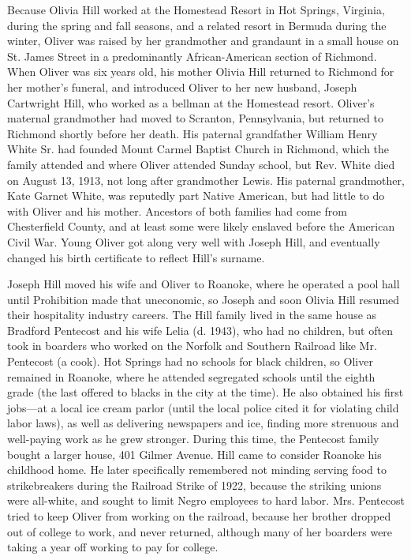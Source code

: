 Because Olivia Hill worked at the Homestead Resort in Hot Springs,
Virginia, during the spring and fall seasons, and a related resort in
Bermuda during the winter, Oliver was raised by her grandmother and
grandaunt in a small house on St. James Street in a predominantly
African-American section of Richmond. When Oliver was six years old, his
mother Olivia Hill returned to Richmond for her mother's funeral, and
introduced Oliver to her new husband, Joseph Cartwright Hill, who worked
as a bellman at the Homestead resort. Oliver's maternal grandmother had
moved to Scranton, Pennsylvania, but returned to Richmond shortly before
her death. His paternal grandfather William Henry White Sr. had founded
Mount Carmel Baptist Church in Richmond, which the family attended and
where Oliver attended Sunday school, but Rev. White died on August 13,
1913, not long after grandmother Lewis. His paternal grandmother, Kate
Garnet White, was reputedly part Native American, but had little to do
with Oliver and his mother. Ancestors of both families had come from
Chesterfield County, and at least some were likely enslaved before the
American Civil War. Young Oliver got along very well with Joseph Hill,
and eventually changed his birth certificate to reflect Hill's surname.

Joseph Hill moved his wife and Oliver to Roanoke, where he operated a
pool hall until Prohibition made that uneconomic, so Joseph and soon
Olivia Hill resumed their hospitality industry careers. The Hill family
lived in the same house as Bradford Pentecost and his wife Lelia (d.
1943), who had no children, but often took in boarders who worked on the
Norfolk and Southern Railroad like Mr. Pentecost (a cook). Hot Springs
had no schools for black children, so Oliver remained in Roanoke, where
he attended segregated schools until the eighth grade (the last offered
to blacks in the city at the time). He also obtained his first jobs---at
a local ice cream parlor (until the local police cited it for violating
child labor laws), as well as delivering newspapers and ice, finding
more strenuous and well-paying work as he grew stronger. During this
time, the Pentecost family bought a larger house, 401 Gilmer Avenue.
Hill came to consider Roanoke his childhood home. He later specifically
remembered not minding serving food to strikebreakers during the
Railroad Strike of 1922, because the striking unions were all-white, and
sought to limit Negro employees to hard labor. Mrs. Pentecost tried to
keep Oliver from working on the railroad, because her brother dropped
out of college to work, and never returned, although many of her
boarders were taking a year off working to pay for college.

